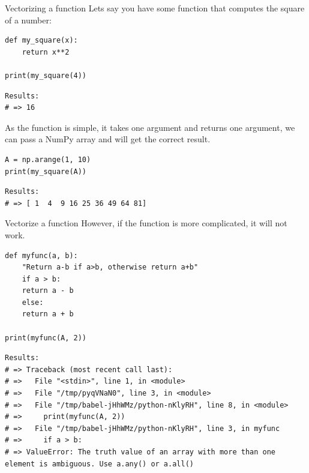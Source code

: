 \documentclass[10pt]{beamer}
\begin{document}
\begin{frame}[label={sec:orgd7f925a},fragile]{Vectorizing a function}
 Lets say you have some function that computes the square of a number:

\begin{verbatim}
def my_square(x):
    return x**2

print(my_square(4))
\end{verbatim}

\begin{verbatim}
Results: 
# => 16
\end{verbatim}


As the function is simple, it takes one argument and returns one argument, we can
pass a NumPy array and will get the correct result.

\begin{verbatim}
A = np.arange(1, 10)
print(my_square(A))
\end{verbatim}

\begin{verbatim}
Results: 
# => [ 1  4  9 16 25 36 49 64 81]
\end{verbatim}
\end{frame}

\begin{frame}[label={sec:org9efa0e2},fragile]{Vectorize a function}
 However, if the function is more complicated, it will not work.

\begin{verbatim}
def myfunc(a, b):
    "Return a-b if a>b, otherwise return a+b"
    if a > b:
	return a - b
    else:
	return a + b

print(myfunc(A, 2))
\end{verbatim}

\begin{verbatim}
Results: 
# => Traceback (most recent call last):
# =>   File "<stdin>", line 1, in <module>
# =>   File "/tmp/pyqVNaN0", line 3, in <module>
# =>   File "/tmp/babel-jHhWMz/python-nKlyRH", line 8, in <module>
# =>     print(myfunc(A, 2))
# =>   File "/tmp/babel-jHhWMz/python-nKlyRH", line 3, in myfunc
# =>     if a > b:
# => ValueError: The truth value of an array with more than one element is ambiguous. Use a.any() or a.all()
\end{verbatim}
\end{frame}
\end{document}
